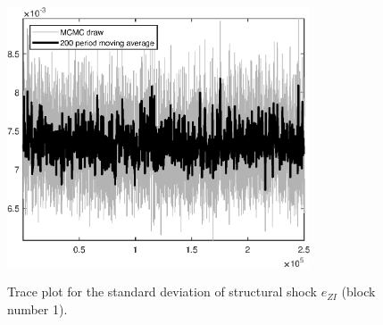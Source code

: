 \begin{figure}[H]
\centering
  \includegraphics[width=0.8\textwidth]{BRS_imp_mobility_alt/graphs/TracePlot_SE_e_ZI_blck_1}\\
    \caption{Trace plot for the standard deviation of structural shock ${e_{ZI}}$ (block number 1).}
\end{figure}
